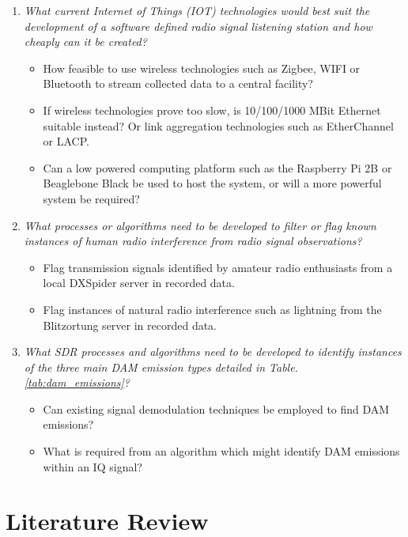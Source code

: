 \documentclass[runningheads,a4paper]{llncs}
\begin{document}
\begin{enumerate}
  \item \textit{What current Internet of Things (\gls{IOT}) technologies would best suit the development of a software defined radio signal listening station and how cheaply can it be created?}
  \begin{itemize}
  	\item How feasible to use wireless technologies such as Zigbee, WIFI or Bluetooth to stream collected data to a central facility?
  	\item If wireless technologies prove too slow, is 10/100/1000 MBit Ethernet suitable instead? Or link aggregation technologies such as EtherChannel or LACP.
  	\item Can a low powered computing platform such as the Raspberry Pi 2B or Beaglebone Black be used to host the system, or will a more powerful system be required?
  \end{itemize}
  
  \item \textit{What processes or algorithms need to be developed to filter or flag known instances of human radio interference from radio signal observations?}
  \begin{itemize}
  	\item Flag transmission signals identified by amateur radio enthusiasts from a local DXSpider server in recorded data.
  	\item Flag instances of natural radio interference such as lightning from the Blitzortung server in recorded data.
  \end{itemize}
  
  \item \textit{What \gls{SDR} processes and algorithms need to be developed to identify instances of the three main \gls{DAM} emission types detailed in Table. \ref{tab:dam_emissions}?}
  \begin{itemize}
  	\item Can existing signal demodulation techniques be employed to find \gls{DAM} emissions?
  	\item What is required from an algorithm which might identify \gls{DAM} emissions within an \gls{IQ} signal?
  \end{itemize}
  
\end{enumerate}

%
%
\newpage
\section*{Literature Review}
\end{document}
